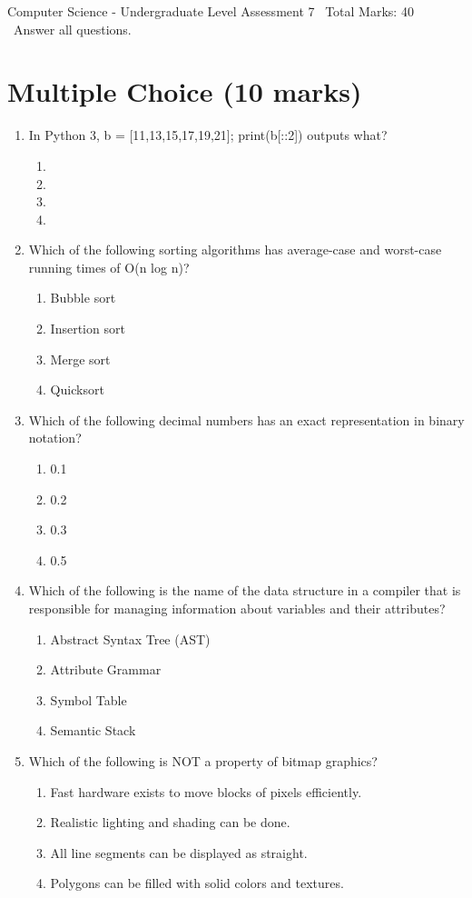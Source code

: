 \documentclass[12pt]{article}
\begin{document}
\begin{center}
Computer Science - Undergraduate Level Assessment 7 \
Total Marks: 40 \
Answer all questions.
\end{center}

\section*{Multiple Choice (10 marks)}
\begin{enumerate}[label=\arabic*.]
\item In Python 3, b = [11,13,15,17,19,21]; print(b[::2]) outputs what?
\begin{enumerate}[label=(\alph*)]
    \item [19,21]
    \item [11,15]
    \item [11,15,19]
    \item [13,17,21]
\end{enumerate}
\item Which of the following sorting algorithms has average-case and worst-case running times of O(n log n)?
\begin{enumerate}[label=(\alph*)]
    \item Bubble sort
    \item Insertion sort
    \item Merge sort
    \item Quicksort
\end{enumerate}
\item Which of the following decimal numbers has an exact representation in binary notation?
\begin{enumerate}[label=(\alph*)]
    \item 0.1
    \item 0.2
    \item 0.3
    \item 0.5
\end{enumerate}
\item Which of the following is the name of the data structure in a compiler that is responsible for managing information about variables and their attributes?
\begin{enumerate}[label=(\alph*)]
    \item Abstract Syntax Tree (AST)
    \item Attribute Grammar
    \item Symbol Table
    \item Semantic Stack
\end{enumerate}
\item Which of the following is NOT a property of bitmap graphics?
\begin{enumerate}[label=(\alph*)]
    \item Fast hardware exists to move blocks of pixels efficiently.
    \item Realistic lighting and shading can be done.
    \item All line segments can be displayed as straight.
    \item Polygons can be filled with solid colors and textures.
\end{enumerate}
\end{enumerate}
\end{document}
